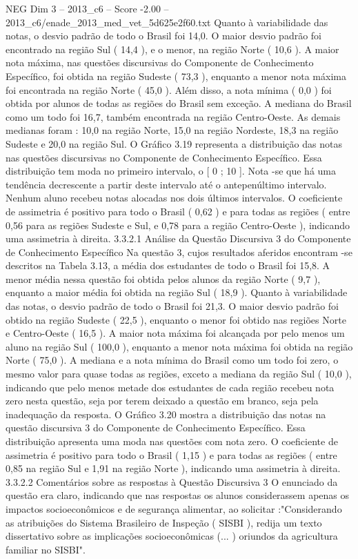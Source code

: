 \begin{textsample}{NEG Dim 3 – 2013\_c6 – Score -2.00 – 2013\_c6/enade\_2013\_med\_vet\_5d625e2f60.txt}
Quanto à variabilidade das notas, o desvio padrão de todo o Brasil foi 14,0.
O maior desvio padrão foi encontrado na região Sul ( 14,4 ), e o menor, na região Norte ( 10,6 ).
A maior nota máxima, nas questões discursivas do Componente de Conhecimento Específico, foi obtida na região Sudeste ( 73,3 ), enquanto a menor nota máxima foi encontrada na região Norte ( 45,0 ).
Além disso, a nota mínima ( 0,0 ) foi obtida por alunos de todas as regiões do Brasil sem exceção.
A mediana do Brasil como um todo foi 16,7, também encontrada na região Centro-Oeste.
As demais medianas foram : 10,0 na região Norte, 15,0 na região Nordeste, 18,3 na região Sudeste e 20,0 na região Sul.
O Gráfico 3.19 representa a distribuição das notas nas questões discursivas no Componente de Conhecimento Específico.
Essa distribuição tem moda no primeiro intervalo, o [ 0 ; 10 ].
Nota -se que há uma tendência decrescente a partir deste intervalo até o antepenúltimo intervalo.
Nenhum aluno recebeu notas alocadas nos dois últimos intervalos.
O coeficiente de assimetria é positivo para todo o Brasil ( 0,62 ) e para todas as regiões ( entre 0,56 para as regiões Sudeste e Sul, e 0,78 para a região Centro-Oeste ), indicando uma assimetria à direita. 3.3.2.1 Análise da Questão Discursiva 3 do Componente de Conhecimento Específico Na questão 3, cujos resultados aferidos encontram -se descritos na Tabela 3.13, a média dos estudantes de todo o Brasil foi 15,8.
A menor média nessa questão foi obtida pelos alunos da região Norte ( 9,7 ), enquanto a maior média foi obtida na região Sul ( 18,9 ).
Quanto à variabilidade das notas, o desvio padrão de todo o Brasil foi 21,3.
O maior desvio padrão foi obtido na região Sudeste ( 22,5 ), enquanto o menor foi obtido nas regiões Norte e Centro-Oeste ( 16,5 ).
A maior nota máxima foi alcançada por pelo menos um aluno na região Sul ( 100,0 ), enquanto a menor nota máxima foi obtida na região Norte ( 75,0 ).
A mediana e a nota mínima do Brasil como um todo foi zero, o mesmo valor para quase todas as regiões, exceto a mediana da região Sul ( 10,0 ), indicando que pelo menos metade dos estudantes de cada região recebeu nota zero nesta questão, seja por terem deixado a questão em branco, seja pela inadequação da resposta.
O Gráfico 3.20 mostra a distribuição das notas na questão discursiva 3 do Componente de Conhecimento Específico.
Essa distribuição apresenta uma moda nas questões com nota zero.
O coeficiente de assimetria é positivo para todo o Brasil ( 1,15 ) e para todas as regiões ( entre 0,85 na região Sul e 1,91 na região Norte ), indicando uma assimetria à direita. 3.3.2.2 Comentários sobre as respostas à Questão Discursiva 3 O enunciado da questão era claro, indicando que nas respostas os alunos considerassem apenas os impactos socioeconômicos e de segurança alimentar, ao solicitar :"Considerando as atribuições do Sistema Brasileiro de Inspeção ( SISBI ), redija um texto dissertativo sobre as implicações socioeconômicas (... ) oriundos da agricultura familiar no SISBI".

\end{textsample}
